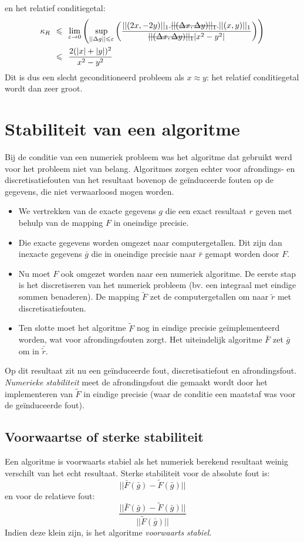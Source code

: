\documentclass[11pt]{report}
\def \lesseq {\hspace{1.5mm}\leqslant\hspace{1.5mm}}
\newcommand{\msout}[1]{\text{\sout{\ensuremath{#1}}}}
\begin{document}
		en het relatief conditiegetal:
		\begin{align*}
			\kappa_R &\lesseq \lim_{\varepsilon \to 0} \left( \sup_{||\Delta g|| \leqslant \varepsilon}\left(\frac{||(2x,- 2y)||_1.\msout{||(\Delta x, \Delta y)||_1}. ||(x, y)||_1}{\msout{||(\Delta x, \Delta y)||_1} |x^2 -y^2|}\right)\right)\\
			&\lesseq \frac{2(|x| + |y|)^2}{x^2-y^2}
		\end{align*}
		Dit is dus een slecht geconditioneerd probleem als $x \approx y$: het relatief conditiegetal wordt dan zeer groot.
		
	\section{Stabiliteit van een algoritme}
		Bij de conditie van een numeriek probleem was het algoritme dat gebruikt werd voor het probleem niet van belang. Algoritmes zorgen echter voor afrondings- en discretisatiefouten van het resultaat bovenop de ge\"{i}nduceerde fouten op de gegevens, die niet verwaarloosd mogen worden. 
		\begin{itemize}
			\item We vertrekken van de exacte gegevens $g$ die een exact resultaat $r$ geven met behulp van de mapping $F$ in oneindige precisie.
			\item Die exacte gegevens worden omgezet naar computergetallen. Dit zijn dan inexacte gegevens $\bar g$ die in oneindige precisie naar $\bar r$ gemapt worden door $F$.
			\item Nu moet $F$ ook omgezet worden naar een numeriek algoritme. De eerste stap is het discretiseren van het numeriek probleem (bv. een integraal met eindige sommen benaderen). De mapping $\tilde F$ zet de computergetallen om naar $\tilde r$ met discretisatiefouten.
			\item Ten slotte moet het algoritme $\tilde F$ nog in eindige precisie ge\"{i}mplementeerd worden, wat voor afrondingsfouten zorgt. Het uiteindelijk algoritme $\bar F$ zet $\bar g$ om in $\bar{\tilde r}$.
		\end{itemize}
		Op dit resultaat zit nu een ge\"{i}nduceerde fout, discretisatiefout en afrondingsfout. \textit{Numerieke stabiliteit} meet de afrondingsfout die gemaakt wordt door het implementeren van $\tilde F$ in eindige precisie (waar de conditie een maatstaf was voor de ge\"{i}nduceerde fout).
	\subsection{Voorwaartse of sterke stabiliteit}
		Een algoritme is voorwaarts stabiel als het numeriek berekend resultaat weinig verschilt van het echt resultaat. Sterke stabiliteit voor de absolute fout is:
		$$||\bar F(\bar g) - \tilde F(\bar g)||$$
		en voor de relatieve fout:
		$$\frac{||\bar F(\bar g) - \tilde F(\bar g)||}{||\tilde F(\bar g)||}$$
		Indien deze klein zijn, is het algoritme \textit{voorwaarts stabiel}.
\end{document}
